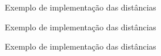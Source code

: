 \begin{frame}[fragile]{Exemplo de implementação das distâncias}
\end{frame}

\begin{frame}[fragile]{Exemplo de implementação das distâncias}
\end{frame}

\begin{frame}[fragile]{Exemplo de implementação das distâncias}
\end{frame}

